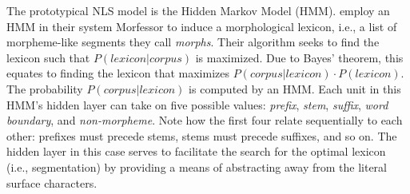 The prototypical NLS model is the Hidden Markov Model (HMM). 
\cite{creutz-and-lagus:2005, creutz-and-lagus:2007} employ an HMM in their system Morfessor to induce a morphological lexicon, i.e., a list of morpheme-like segments they call \textit{morphs}. 
Their algorithm seeks to find the lexicon such that $P(lexicon|corpus)$ is maximized. Due to Bayes' theorem, this equates to finding the lexicon that maximizes $P(corpus|lexicon) \cdot P(lexicon)$. The probability $P(corpus|lexicon)$ is computed by an HMM. Each unit in this HMM's hidden layer can take on five possible values: \textit{prefix}, \textit{stem}, \textit{suffix}, \textit{word boundary}, and \textit{non-morpheme}. 
Note how the first four relate sequentially to each other: prefixes must precede stems, stems must precede suffixes, and so on.
The hidden layer in this case serves to facilitate the search for the optimal lexicon 
(i.e., segmentation) by providing a means of abstracting away from the literal surface characters.

